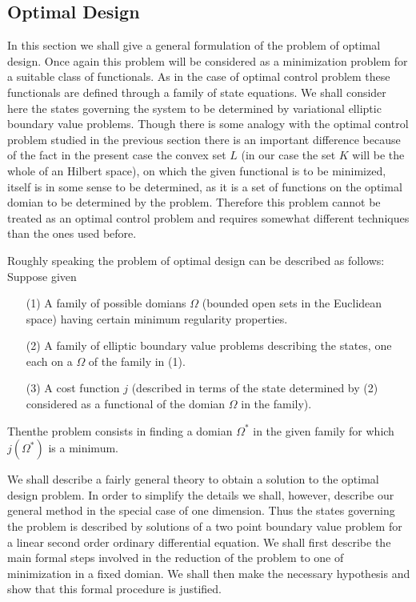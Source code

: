 \setcounter{subsection}{-1}
\subsection{Optimal Design}\label{chap6-subsec2.0}

In this section we shall give a general formulation of the problem of
optimal design. Once again this problem will be considered as a
minimization problem for a suitable class of functionals. As in the
case of optimal control problem these functionals are defined through
a family of state equations. We shall consider here the states
governing the system to be determined by variational elliptic boundary
value problems. Though there is some analogy with the optimal control
problem studied in the previous section there is an important
difference because of the fact in the present case the convex set $L$
(in our case the set $K$ will be the whole of an Hilbert space), on
which the given functional is to be minimized, itself is in some sense
to be determined, as it is a set of functions on the optimal domian to
be determined by the problem. Therefore this problem cannot be treated
as an optimal control problem and requires somewhat different
techniques than the ones used before. 

Roughly speaking the problem of optimal design can be described as follows: Suppose given
\begin{enumerate}
\item[(1)] A family of possible domians $\Omega$ (bounded open sets in
  the Euclidean space) having certain minimum regularity properties. 

\item[(2)] A family of elliptic boundary value problems describing the
  states, one each on a $\Omega$ of the family in (1). 

\item[(3)] A cost function $j$ (described in terms of the state
  determined by (2) considered as a functional of the domian $\Omega$
  in the family). 
\end{enumerate}

Then\pageoriginale the problem consists in finding a domian $\Omega
^{*}$ in the given family for which $j(\Omega^{*})$ is a minimum. 

We shall describe a fairly general theory to obtain a solution to the
optimal design problem. In order to simplify the details we shall,
however, describe our general method in the special case of one
dimension. Thus the states governing the problem is described by
solutions of a two point boundary value problem for a linear second
order ordinary differential equation. We shall first describe the main
formal steps involved in the reduction of the problem to one of
minimization in a fixed domian. We shall then make the necessary
hypothesis and show that this formal procedure is justified. 

